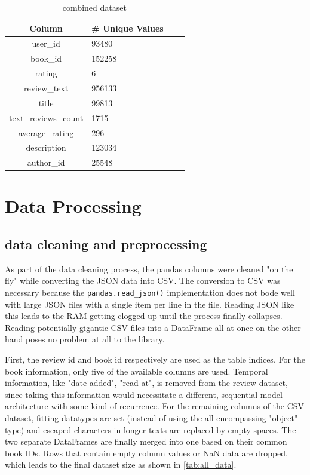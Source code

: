 \documentclass[10pt,final,journal,a4paper,oneside,twocolumn]{IEEEtran}
\begin{document}
\begin{table}[h]
    \centering
    \caption{combined dataset}
    \label{tab:all_data}
        \begin{tabular}{clll}
                \toprule
                Column & \# Unique Values \\
                \midrule
                user\_id & 93480  \\
                book\_id & 152258\\
                rating & 6\\
                review\_text & 956133\\
                title & 99813 \\
                text\_reviews\_count & 1715 \\
                average\_rating & 296 \\
                description & 123034 \\
                author\_id & 25548 \\
                \bottomrule
        \end{tabular}
    \end{table}

\section{Data Processing}\label{sec:data_preprocessing}
\subsection{data cleaning and preprocessing}
As part of the data cleaning process, the pandas columns were cleaned "on the fly" while converting the JSON data into CSV.
The conversion to CSV was necessary because the \texttt{pandas.read_json()} implementation does not bode well with large JSON files with a single item per line in the file. Reading JSON like this leads to the RAM getting clogged up until the process finally collapses. Reading potentially gigantic CSV files into a DataFrame all at once on the other hand poses no problem at all to the library.

First, the review id and book id respectively are used as the table indices. For the book information, only five of the available columns are used. Temporal information, like "date added", "read at", is removed from the review dataset, since taking this information would necessitate a different, sequential model architecture with some kind of recurrence.
For the remaining columns of the CSV dataset, fitting datatypes are set (instead of using the all-encompassing "object" type) and escaped characters in longer texts are replaced by empty spaces.
The two separate DataFrames are finally merged into one based on their common book IDs. Rows that contain empty column values or NaN data are dropped, which leads to the final dataset size as shown in \autoref{tab:all_data}.
\end{document}
